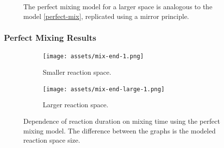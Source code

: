\documentclass{beamer}
\begin{document}
\begin{frame}
\begin{figure}
    \caption{The perfect mixing model for a larger space is analogous to the model \eqref{perfect-mix}, replicated using a mirror principle.}
    \label{large-perfect-mix}
\end{figure}
\end{frame}

\begin{frame}
  \frametitle{Perfect Mixing Results}

  \begin{figure}
    \centering
    \begin{subfigure}[t]{0.45\linewidth}
      \texttt{[image: assets/mix-end-1.png]}
      \caption{Smaller reaction space. \label{fig:perfect-small}}
    \end{subfigure}
    \hfill
    \begin{subfigure}[t]{0.45\linewidth}
      \texttt{[image: assets/mix-end-large-1.png]}
      \caption{Larger reaction space. \label{fig:perfect-large}}
    \end{subfigure}
    \caption{Dependence of reaction duration on mixing time using the perfect mixing model. The difference between the graphs is the modeled reaction space size.}
  \end{figure}

\end{frame}

\end{document}

